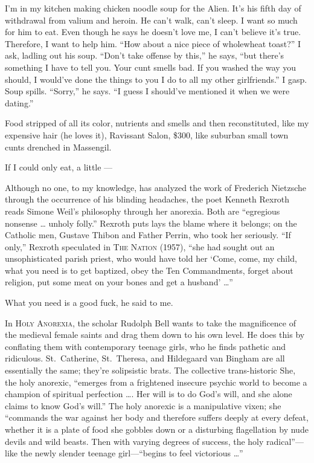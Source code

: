 \documentclass[
]{memoir}
\begin{document}
I'm in my kitchen making chicken noodle soup for the Alien. It's his
fifth day of withdrawal from valium and heroin. He can't walk, can't
sleep. I want so much for him to eat. Even though he says he doesn't
love me, I can't believe it's true. Therefore, I want to help him. ``How
about a nice piece of wholewheat toast?'' I ask, ladling out his soup.
``Don't take offense by this,'' he says, ``but there's something I have
to tell you. Your cunt smells bad. If you washed the way you should, I
would've done the things to you I do to all my other girlfriends.'' I
gasp. Soup spills. ``Sorry,'' he says. ``I guess I should've mentioned
it when we were dating.''

Food stripped of all its color, nutrients and smells and then
reconstituted, like my expensive hair (he loves it), Ravissant Salon,
\$300, like suburban small town cunts drenched in Massengil.

If I could only eat, a little ---

Although no one, to my knowledge, has analyzed the work of Frederich
Nietzsche through the occurrence of his blinding headaches, the poet
Kenneth Rexroth reads Simone Weil's philosophy through her anorexia.
Both are ``egregious nonsense \ldots{} unholy folly.'' Rexroth puts lays
the blame where it belongs; on the Catholic men, Gustave Thibon and
Father Perrin, who took her seriously. ``If only,'' Rexroth speculated
in \textsc{The Nation} (1957), ``she had sought out an unsophisticated
parish priest, who would have told her `Come, come, my child, what you
need is to get baptized, obey the Ten Commandments, forget about
religion, put some meat on your bones and get a husband' \ldots{}''

What you need is a good fuck, he said to me.

In \textsc{Holy Anorexia}, the scholar Rudolph Bell wants to take the
magnificence of the medieval female saints and drag them down to his own
level. He does this by conflating them with contemporary teenage girls,
who he finds pathetic and ridiculous. St.~Catherine, St.~Theresa, and
Hildegaard van Bingham are all essentially the same; they're solipsistic
brats. The collective trans-historic She, the holy anorexic, ``emerges
from a frightened insecure psychic world to become a champion of
spiritual perfection \ldots{}. Her will is to do God's will, and she
alone claims to know God's will.'' The holy anorexic is a manipulative
vixen; she ``commands the war against her body and therefore suffers
deeply at every defeat, whether it is a plate of food she gobbles down
or a disturbing flagellation by nude devils and wild beasts. Then with
varying degrees of success, the holy radical''---like the newly slender
teenage girl---``begins to feel victorious \ldots{}''
\end{document}
